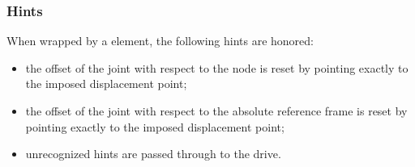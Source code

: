 \subsubsection{Hints}
When wrapped by a  element, the following hints are honored:
\begin{itemize}
\item {} the offset of the joint
with respect to the node is reset by pointing exactly
to the imposed displacement point;
\item {} the offset of the joint
with respect to the absolute reference frame is reset by pointing exactly
to the imposed displacement point;
\item unrecognized hints are passed through to the drive.
\end{itemize}




